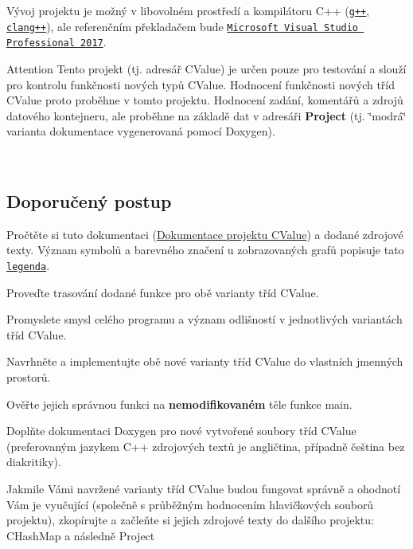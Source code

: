 Vývoj projektu je možný v libovolném prostředí a kompilátoru C++ (\href{http://gcc.gnu.org/}{\tt g++}, \href{http://clang.llvm.org/}{\tt clang++}), ale referenčním překladačem bude \href{http://www.visualstudio.com/}{\tt Microsoft Visual Studio Professional 2017}.

\begin{DoxyAttention}{Attention}
Tento projekt (tj. adresář C\+Value) je určen pouze pro testování a slouží pro kontrolu funkčnosti nových typů {\ttfamily C\+Value}. Hodnocení funkčnosti nových tříd {\ttfamily C\+Value} proto proběhne v tomto projektu. Hodnocení zadání, komentářů a zdrojů datového kontejneru, ale proběhne na základě dat v adresáři {\bfseries Project} (tj. \char`\"{}modrá\char`\"{} varianta dokumentace vygenerovaná pomocí Doxygen).
\end{DoxyAttention}
~\newline
\subsection*{Doporučený postup}


\begin{DoxyEnumerate}
\item Pročtěte si tuto dokumentaci (\hyperlink{doc}{Dokumentace projektu C\+Value}) a dodané zdrojové texty. Význam symbolů a barevného značení u zobrazovaných grafů popisuje tato \href{graph_legend.html}{\tt legenda}.
\item Proveďte trasování dodané funkce pro obě varianty tříd {\ttfamily C\+Value}.
\item Promyslete smysl celého programu a význam odlišností v jednotlivých variantách tříd C\+Value.
\item Navrhněte a implementujte obě nové varianty tříd {\ttfamily C\+Value} do vlastních jmenných prostorů.
\item Ověřte jejich správnou funkci na {\bfseries nemodifikovaném} těle funkce {\ttfamily main}.
\item Doplňte dokumentaci Doxygen pro nové vytvořené soubory tříd {\ttfamily C\+Value} (preferovaným jazykem C++ zdrojových textů je angličtina, případně čeština bez diakritiky).
\item Jakmile Vámi navržené varianty tříd {\ttfamily C\+Value} budou fungovat správně a ohodnotí Vám je vyučující (společně s průběžným hodnocením hlavičkových souborů projektu), zkopírujte a začleňte si jejich zdrojové texty do dalšího projektu\+: C\+Hash\+Map a následně Project
\end{DoxyEnumerate}

